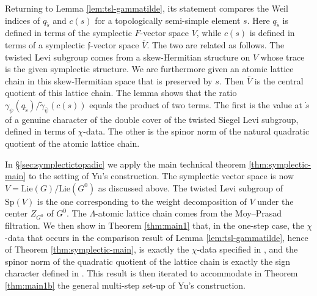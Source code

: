 \documentclass{article}
\def\tx#1{\textrm{#1}}
\def\ol#1{\overline{#1}}
\theoremstyle{definition}
\numberwithin{equation}{subsection}
\renewcommand{\-}{\hyp{}}
\newcommand{\rf}{\mathfrak{f}}
\begin{document}
Returning to Lemma \ref{lem:tsl-gammatilde}, its statement compares the Weil indices of $q_{\tilde s}$ and $c(s)$ for a topologically semi-simple element $s$. Here $q_{\tilde s}$ is defined in terms of the symplectic $F$-vector space $V$, while $c(s)$ is defined in terms of a symplectic $\rf$-vector space $\ol{V}$. The two are related as follows. The twisted Levi subgroup comes from a skew-Hermitian structure on $V$ whose trace is the given symplectic structure. We are furthermore given an atomic lattice chain in this skew-Hermitian space that is preserved by $s$. Then $\ol{V}$ is the central quotient of this lattice chain. The lemma shows that the ratio $\gamma_\psi(q_{\tilde s})/\tilde\gamma_{\bar\psi}(c(s))$ equals the product of two terms. The first is the value at $\dot s$ of a genuine character of the double cover of the twisted Siegel Levi subgroup, defined in terms of $\chi$-data. The other is the spinor norm of the natural quadratic quotient of the atomic lattice chain.

In \S\ref{sec:symplectictopadic} we apply the main technical theorem \ref{thm:symplectic-main} to the setting of Yu's construction. The symplectic vector space is now $V=\tx{Lie}(G)/\tx{Lie}(G^0)$ as discussed above. The twisted Levi subgroup of $\tx{Sp}(V)$ is the one corresponding to the weight decomposition of $V$ under the center $Z_{G^0}$ of $G^0$. The $\Lambda$-atomic lattice chain comes from the Moy--Prasad filtration. We then show in Theorem \ref{thm:main1} that, in the one-step case, the $\chi$-data that occurs in the comparison result of Lemma \ref{lem:tsl-gammatilde}, hence of Theorem \ref{thm:symplectic-main}, is exactly the $\chi$-data specified in \cite[\S4.2]{FKS23}, and the spinor norm of the quadratic quotient of the lattice chain is exactly the sign character defined in \cite{FKS23}. This result is then iterated to accommodate in Theorem \ref{thm:main1b} the general multi-step set-up of Yu's construction.
\end{document}
